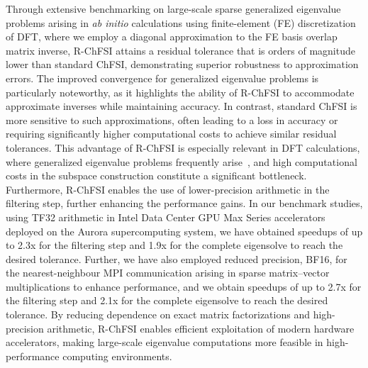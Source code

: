 \documentclass[preprint,3p,number,sort&compress]{elsarticle}
\begin{document}
Through extensive benchmarking on large-scale sparse generalized eigenvalue problems arising in \emph{ab initio} calculations using finite-element (FE) discretization of DFT, where we employ a diagonal approximation to the FE basis overlap matrix inverse, R-ChFSI attains a residual tolerance that is orders of magnitude lower than standard ChFSI, demonstrating superior robustness to approximation errors. The improved convergence for generalized eigenvalue problems is particularly noteworthy, as it highlights the ability of R-ChFSI to accommodate approximate inverses while maintaining accuracy. In contrast, standard ChFSI is more sensitive to such approximations, often leading to a loss in accuracy or requiring significantly higher computational costs to achieve similar residual tolerances. This advantage of R-ChFSI is especially relevant in DFT calculations, where generalized eigenvalue problems frequently arise~\cite{levittParallelEigensolversPlanewave2015,ramakrishnanFastScalableFiniteelement2025,dasDFTFE10Massively2022}, and high computational costs in the subspace construction constitute a significant bottleneck. Furthermore, R-ChFSI enables the use of lower-precision arithmetic in the filtering step, further enhancing the performance gains. In our benchmark studies, using TF32 arithmetic in Intel Data Center GPU Max Series accelerators deployed on the Aurora supercomputing system, we have obtained speedups of up to 2.3x for the filtering step and 1.9x for the complete eigensolve to reach the desired tolerance. Further, we have also employed reduced precision, BF16, for the nearest-neighbour MPI communication arising in sparse matrix--vector multiplications to enhance performance, and we obtain speedups of up to 2.7x for the filtering step and 2.1x for the complete eigensolve to reach the desired tolerance. By reducing dependence on exact matrix factorizations and high-precision arithmetic, R-ChFSI enables efficient exploitation of modern hardware accelerators, making large-scale eigenvalue computations more feasible in high-performance computing environments.
\end{document}
